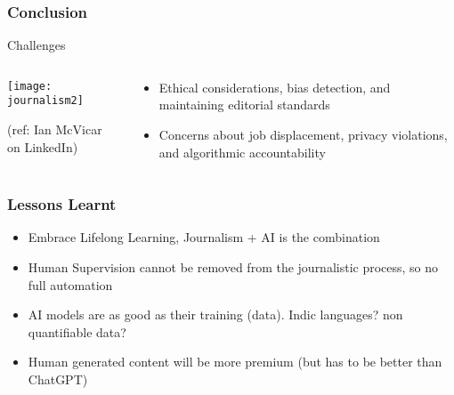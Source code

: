 \begin{frame}[fragile]\frametitle{Conclusion}
Challenges
\begin{columns}
    \begin{column}[T]{0.6\linewidth}
		\begin{center}
		\texttt{[image: journalism2]}
		
		{\tiny (ref: Ian McVicar on LinkedIn)}		
		\end{center}

    \end{column}
    \begin{column}[T]{0.4\linewidth}

			\begin{itemize}
				\item Ethical considerations, bias detection, and maintaining editorial standards
				\item Concerns about job displacement, privacy violations, and algorithmic accountability
			\end{itemize}
    \end{column}
  \end{columns}
\end{frame}


\begin{frame}[fragile]\frametitle{Lessons Learnt}

\begin{itemize}
\item Embrace Lifelong Learning, Journalism + AI is the combination
\item Human Supervision cannot be removed from the journalistic process, so no full automation
\item AI models are as good as their training (data). Indic languages? non quantifiable data?
\item Human generated content will be more premium (but has to be better than ChatGPT)
\end{itemize}

\end{frame}